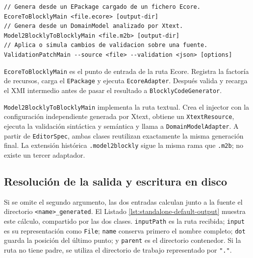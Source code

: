 \begin{lstlisting}[style=tfmcli, caption={Interfaces comentadas de los puntos de entrada independientes}, label={lst:entradas-standalone}]
// Genera desde un EPackage cargado de un fichero Ecore.
EcoreToBlocklyMain <file.ecore> [output-dir]
// Genera desde un DomainModel analizado por Xtext.
Model2BlocklyToBlocklyMain <file.m2b> [output-dir]
// Aplica o simula cambios de validacion sobre una fuente.
ValidationPatchMain --source <file> --validation <json> [options]
\end{lstlisting}

\texttt{EcoreToBlocklyMain} es el punto de entrada de la ruta Ecore. Registra la
factoría de recursos, carga el \texttt{EPackage} y ejecuta
\texttt{EcoreAdapter}. Después valida y recarga el XMI intermedio antes de pasar
el resultado a \texttt{BlocklyCodeGenerator}.

\texttt{Model2BlocklyToBlocklyMain} implementa la ruta textual. Crea el injector
con la configuración independiente generada por Xtext, obtiene un \texttt{XtextResource},
ejecuta la validación sintáctica y semántica y llama a
\texttt{DomainModelAdapter}. A partir de \texttt{EditorSpec}, ambas clases
reutilizan exactamente la misma generación final. La extensión histórica
\texttt{.model2blockly} sigue la misma rama que \texttt{.m2b}; no existe un
tercer adaptador.

\subsection{Resolución de la salida y escritura en disco}

Si se omite el segundo argumento, las dos entradas calculan junto a la fuente
el directorio \texttt{<name>\_generated}. El Listado
\ref{lst:standalone-default-output} muestra este cálculo, compartido por las
dos clases. \texttt{inputPath} es la ruta recibida; \texttt{input} es su
representación como \texttt{File}; \texttt{name} conserva primero el nombre
completo; \texttt{dot} guarda la posición del último punto; y \texttt{parent}
es el directorio contenedor. Si la ruta no tiene padre, se utiliza el
directorio de trabajo representado por \texttt{"."}.

